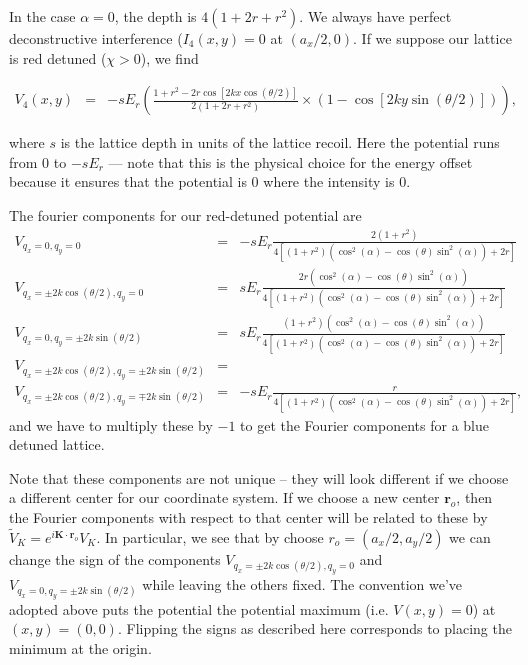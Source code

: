 \documentclass{article}
\theoremstyle{definition}
\begin{document}
In the case $\alpha=0$, the depth is $4(1 + 2r + r^2)$. We always have perfect deconstructive interference ($I_4(x,y) = 0$ at $(a_x/2, 0)$. If we suppose our lattice is red detuned ($\chi > 0$), we find

\begin{eqnarray}
  V_4(x,y)&=& -s E_r \left(\frac{1 + r^2 - 2r \cos[2kx\cos(\theta/2)]}{2(1 + 2r + r^2)} \times \left( 1 - \cos[2ky\sin(\theta/2)] \right)\right),
\end{eqnarray}

where $s$ is the lattice depth in units of the lattice recoil. Here the potential runs from $0$ to $-sE_r$ --- note that this is the physical choice for the energy offset because it ensures that the potential is $0$ where the intensity is $0$.

The fourier components for our red-detuned potential are
\begin{eqnarray}
V_{q_x = 0, q_y = 0} &=& -s E_r \frac{2(1+r^2)}{4 \left[(1 + r^2) \left(\cos^2(\alpha) - \cos(\theta)\sin^2(\alpha) \right) + 2r \right]} \\
V_{q_x = \pm 2k \cos(\theta/2), q_y = 0} &=& s E_r\frac{2r \left(\cos^2(\alpha) - \cos(\theta)\sin^2(\alpha) \right)}{4 \left[(1 + r^2) \left(\cos^2(\alpha) - \cos(\theta)\sin^2(\alpha) \right) + 2r \right]}\\
V_{q_x = 0, q_y = \pm 2k \sin(\theta/2)} &=& s E_r \frac{(1 + r^2) \left(\cos^2(\alpha) - \cos(\theta)\sin^2(\alpha) \right)}{4 \left[(1 + r^2) \left(\cos^2(\alpha) - \cos(\theta)\sin^2(\alpha) \right) + 2r \right]} \\
V_{q_x = \pm 2k \cos(\theta/2), q_y = \pm 2k \sin(\theta/2)} &=& \nonumber \\
V_{q_x = \pm 2k \cos(\theta/2), q_y = \mp 2k \sin(\theta/2)} &=& -s E_r \frac{r}{4 \left[(1 + r^2) \left(\cos^2(\alpha) - \cos(\theta)\sin^2(\alpha) \right) + 2r \right]},
\end{eqnarray}
and we have to multiply these by $-1$ to get the Fourier components for a blue detuned lattice.

Note that these components are not unique -- they will look different if we choose a different center for our coordinate system. If we choose a new center $\mathbf{r}_o$, then the Fourier components with respect to that center will be related to these by $\tilde{V}_K = e^{i \mathbf{K} \cdot \mathbf{r}_o} V_K$. In particular, we see that by choose $r_o = (a_x/2, a_y/2)$ we can change the sign of the components $V_{q_x = \pm 2k \cos(\theta/2), q_y = 0}$ and $V_{q_x = 0, q_y = \pm 2k \sin(\theta/2)}$ while leaving the others fixed. The convention we've adopted above puts the potential the potential maximum (i.e. $V(x,y) = 0$) at $(x,y) = (0,0)$. Flipping the signs as described here corresponds to placing the minimum at the origin.
\end{document}
